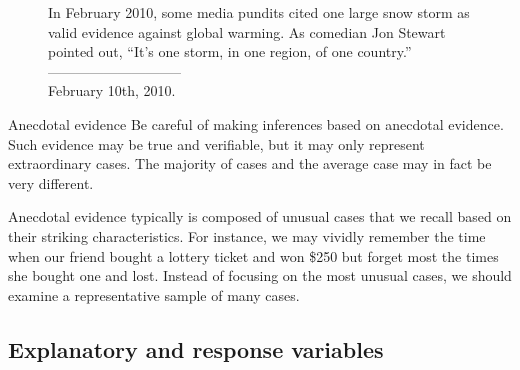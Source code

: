 \setlength{\captionwidth}{\textwidth-80mm}
\begin{figure}
\centering
  \hspace{8mm}\hspace{4mm}
  \begin{minipage}[b]{\textwidth-75mm}
   \caption[anecdotal evidence]{In February 2010, some media pundits cited one large snow storm as valid evidence against global warming. As comedian Jon Stewart pointed out, ``It's one storm, in one region, of one country.''\vspace{-4.5mm} \\

   -----------------------------\vspace{-2mm}\\
   {\footnotesize February 10th, 2010.}
   \label{mnWinter}}
\end{minipage}
\end{figure}
\setlength{\captionwidth}{\mycaptionwidth}

\begin{onebox}{Anecdotal evidence}
Be careful of making inferences based on anecdotal evidence. Such evidence may be true and verifiable, but it may only represent extraordinary cases. The majority of cases and the average case may in fact be very different.\end{onebox}

Anecdotal evidence typically is composed of unusual cases that we recall based on their striking characteristics. For instance, we may vividly remember the time when our friend bought a lottery ticket and won \$250 but forget most the times she bought one and lost. Instead of focusing on the most unusual cases, we should examine a representative sample of many cases.


\D{\newpage}

\subsection{Explanatory and response variables}
\label{explanatoryAndResponse}


